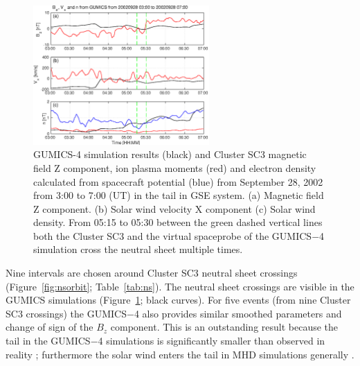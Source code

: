 \documentclass[b5paper,10pt]{article}
\begin{document}
\begin{figure}[t]
\centering
\includegraphics[width=0.6\textwidth,angle=0]{mufcikk-f13} 
\caption{GUMICS-4 simulation results (black) and Cluster SC3 magnetic field Z component, ion plasma moments (red) and electron density calculated from spacecraft potential (blue) from September 28, 2002 from 3:00 to 7:00 (UT) in the tail in GSE system. (a) Magnetic field Z component. (b) Solar wind velocity X component (c) Solar wind density. From 05:15 to 05:30 between the green dashed vertical lines both the Cluster SC3 and the virtual spaceprobe of the GUMICS$-$4 simulation cross the neutral sheet multiple times.}
\label{fig:nsplot}
\end{figure}

Nine intervals are chosen around Cluster SC3 neutral sheet crossings (Figure~\ref{fig:nsorbit}; Table~\ref{tab:ns}). %
The neutral sheet crossings are visible in the GUMICS simulations (Figure~\ref{fig:nsplot}; black curves). For five events (from nine Cluster SC3 crossings) the GUMICS$-$4 also provides similar smoothed parameters and change of sign of the $B_{z}$ component. This is an outstanding result because the tail in the GUMICS$-$4 simulations is significantly smaller than observed in reality \citep{gordeev13:_verif_gumic_mhd,facsko16:_one_earth}; furthermore the solar wind enters the tail in MHD simulations generally \citep{kallio15:_proper}.
\end{document}

